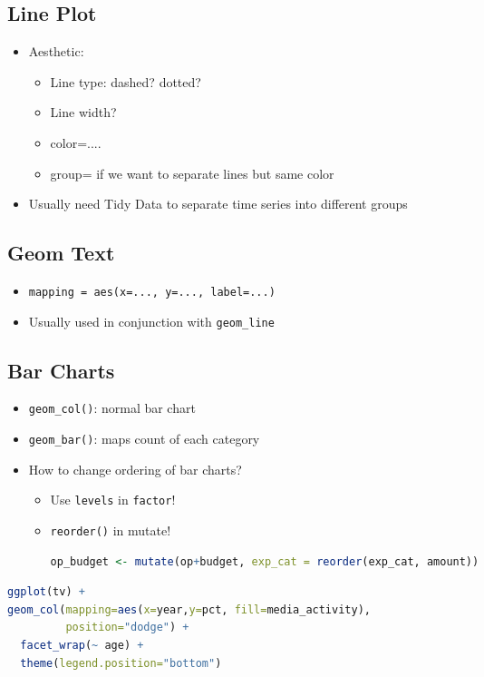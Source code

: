 \documentclass{article}
\begin{document}
\begin{multicols}{2}
\subsection{Line Plot}
\begin{itemize}
	\item Aesthetic:
	\begin{itemize}
		\item Line type: dashed? dotted?
		\item Line width?
		\item color=....
		\item group= if we want to separate lines but same color
	\end{itemize}
    \item Usually need Tidy Data to separate time series into different groups
\end{itemize}

\subsection{Geom Text}
\begin{itemize}
	\item \texttt{mapping = aes(x=..., y=..., label=...)}
	\item Usually used in conjunction with \texttt{geom\_line}
\end{itemize}
\subsection{Bar Charts}
\begin{itemize}
	\item \texttt{geom\_col()}: normal bar chart
	\item \texttt{geom\_bar()}: maps count of each category
	\item How to change ordering of bar charts?
	\begin{itemize}
		\item Use \texttt{levels} in \texttt{factor}!
		\item \texttt{reorder()} in mutate!
		\begin{lstlisting}[language=R]
op_budget <- mutate(op+budget, exp_cat = reorder(exp_cat, amount))\end{lstlisting}
	\end{itemize}
\end{itemize}
\begin{lstlisting}[language=R]
ggplot(tv) +
geom_col(mapping=aes(x=year,y=pct, fill=media_activity),
         position="dodge") +
  facet_wrap(~ age) +
  theme(legend.position="bottom")
\end{lstlisting}

\end{multicols}
\end{document}
